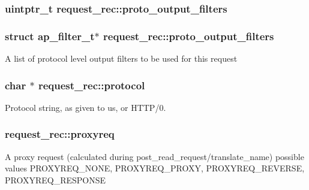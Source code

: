 \subsubsection[{\texorpdfstring{proto\+\_\+output\+\_\+filters}{proto_output_filters}}]{\setlength{\rightskip}{0pt plus 5cm}uintptr\+\_\+t request\+\_\+rec\+::proto\+\_\+output\+\_\+filters}\hypertarget{structrequest__rec_a1031d2b213e4febecdbc04473b94d17f}{}\label{structrequest__rec_a1031d2b213e4febecdbc04473b94d17f}
\subsubsection[{\texorpdfstring{proto\+\_\+output\+\_\+filters}{proto_output_filters}}]{\setlength{\rightskip}{0pt plus 5cm}struct {\bf ap\+\_\+filter\+\_\+t}$\ast$ request\+\_\+rec\+::proto\+\_\+output\+\_\+filters}\hypertarget{structrequest__rec_a9f66298f37a3dc652677e832b5f8ffd7}{}\label{structrequest__rec_a9f66298f37a3dc652677e832b5f8ffd7}
A list of protocol level output filters to be used for this request 
\subsubsection[{\texorpdfstring{protocol}{protocol}}]{\setlength{\rightskip}{0pt plus 5cm}char $\ast$ request\+\_\+rec\+::protocol}\hypertarget{structrequest__rec_aeae0702e31c945785bb91e36bcab7830}{}\label{structrequest__rec_aeae0702e31c945785bb91e36bcab7830}
Protocol string, as given to us, or H\+T\+T\+P/0. 
\subsubsection[{\texorpdfstring{proxyreq}{proxyreq}}]{ request\+\_\+rec\+::proxyreq}\hypertarget{structrequest__rec_a82ca03c6dcfcacbf7001ff85e462289d}{}\label{structrequest__rec_a82ca03c6dcfcacbf7001ff85e462289d}
A proxy request (calculated during post\+\_\+read\+\_\+request/translate\+\_\+name) possible values P\+R\+O\+X\+Y\+R\+E\+Q\+\_\+\+N\+O\+NE, P\+R\+O\+X\+Y\+R\+E\+Q\+\_\+\+P\+R\+O\+XY, P\+R\+O\+X\+Y\+R\+E\+Q\+\_\+\+R\+E\+V\+E\+R\+SE, P\+R\+O\+X\+Y\+R\+E\+Q\+\_\+\+R\+E\+S\+P\+O\+N\+SE 
